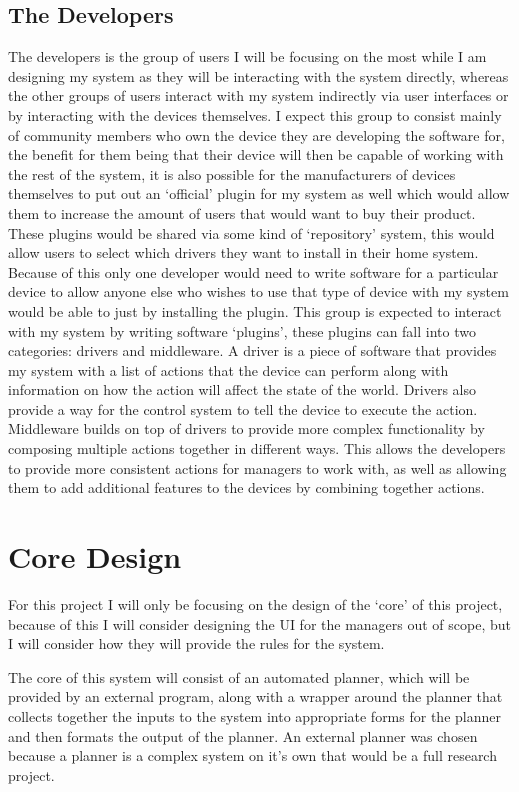 \subsection{The Developers}
The developers is the group of users I will be focusing on the most while I am
designing my system as they will be interacting with the system directly,
whereas the other groups of users interact with my system indirectly via user
interfaces or by interacting with the devices themselves. I expect this group to
consist mainly of community members who own the device they are developing the
software for, the benefit for them being that their device will then be capable
of working with the rest of the system, it is also possible for the
manufacturers of devices themselves to put out an `official' plugin for my
system as well which would allow them to increase the amount of users that would
want to buy their product. These plugins would be shared via some kind of
`repository' system, this would allow users to select which drivers they want to
install in their home system. Because of this only one developer would need to
write software for a particular device to allow anyone else who wishes to use
that type of device with my system would be able to just by installing the
plugin. This group is expected to interact with my system by writing software
`plugins', these plugins can fall into two categories: drivers and middleware. A
driver is a piece of software that provides my system with a list of actions
that the device can perform along with information on how the action will affect
the state of the world. Drivers also provide a way for the control system to
tell the device to execute the action. Middleware builds on top of drivers to
provide more complex functionality by composing multiple actions together in
different ways. This allows the developers to provide more consistent actions
for managers to work with, as well as allowing them to add additional features
to the devices by combining together actions.

\section{Core Design}
For this project I will only be focusing on the design of the `core' of this
project, because of this I will consider designing the UI for the managers out
of scope, but I will consider how they will provide the rules for the system.

The core of this system will consist of an automated planner, which will be
provided by an external program, along with a wrapper around the planner that
collects together the inputs to the system into appropriate forms for the
planner and then formats the output of the planner. An external planner was
chosen because a planner is a complex system on it's own that would be a full
research project.

